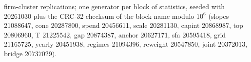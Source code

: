 \begin{table}[p]
firm-cluster replications; one generator per block of statistics, seeded with 20261030 plus the CRC-32 checksum of the block name modulo $10^6$ (slopes 21088647, cone 20287800, spend 20456611, scale 20281130, capint 20868987, top 20806960, T 21225542, gap 20874387, anchor 20627171, sfa 20595418, grid 21165725, yearly 20451938, regimes 21094396, reweight 20547850, joint 20372013, bridge 20737029).
\end{table}
